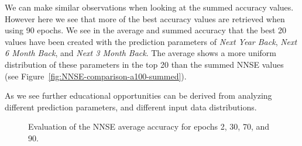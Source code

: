 We can make similar observations when looking at the summed accuracy values. However here we see that more of the best accuracy values are retrieved when using 90 epochs.  We see in the average and summed accuracy that the best 20 values have been created with the prediction parameters of {\em Next Year Back}, {\em Next 6 Month Back}, and {\em
  Next 3 Month Back}. The average shows a more uniform distribution of
these parameters in the top 20 than the summed NNSE values (see
Figure~\ref{fig:NNSE-comparison-a100-summed}).

As we see further educational opportunities can be derived from analyzing different prediction parameters, and different input data distributions.

\begin{figure}[p]

  
  \caption {Evaluation of the NNSE average accuracy for epochs 2, 30, 70, and 90.}
  \label{fig:NNSE-comparison-a100}

\end{figure}


